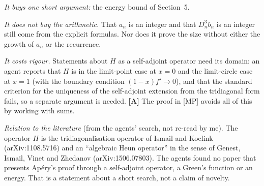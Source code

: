 \documentclass[11pt]{article}
\begin{document}
\emph{It buys one short argument:} the energy bound of Section~5.

\emph{It does not buy the arithmetic.} That $a_n$ is an integer and that $D_n^3b_n$ is an integer
still come from the explicit formulas. Nor does it prove the size without either the growth of
$a_n$ or the recurrence.

\emph{It costs rigour.} Statements about $H$ as a self-adjoint operator need its domain: an agent
reports that $H$ is in the limit-point case at $x=0$ and the limit-circle case at $x=1$ (with
the boundary condition $(1-x)f'\to0$), and that the standard criterion for the uniqueness of the
self-adjoint extension from the tridiagonal form fails, so a separate argument is needed.
\textbf{[A]} The proof in [MP] avoids all of this by working with sums.

\emph{Relation to the literature} (from the agents' search, not re-read by me). The operator $H$
is the tridiagonalisation operator of Ismail and Koelink (arXiv:1108.5716) and an ``algebraic Heun
operator'' in the sense of Genest, Ismail, Vinet and Zhedanov (arXiv:1506.07803). The agents found
no paper that presents Ap\'ery's proof through a self-adjoint operator, a Green's function or an
energy. That is a statement about a short search, not a claim of novelty.
\end{document}
